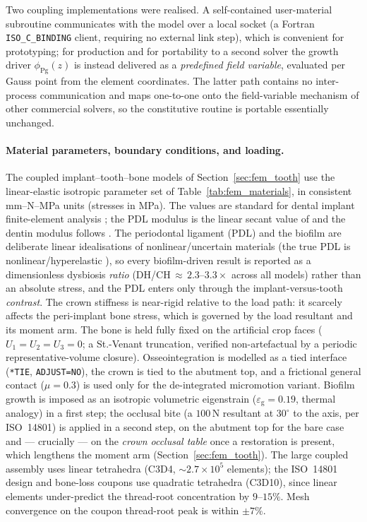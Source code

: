 Two coupling implementations were realised. A self-contained user-material
subroutine communicates with the model over a local socket (a Fortran
\texttt{ISO\_C\_BINDING} client, requiring no external link step), which is
convenient for prototyping; for production and for portability to a second solver the
growth driver $\phi_\mathrm{Pg}(z)$ is instead delivered as a \emph{predefined field
variable}, evaluated per Gauss point from the element coordinates. The latter path
contains no inter-process communication and maps one-to-one onto the field-variable
mechanism of other commercial solvers, so the constitutive routine is portable
essentially unchanged.

\paragraph{Material parameters, boundary conditions, and loading.}
The coupled implant--tooth--bone models of Section~\ref{sec:fem_tooth} use the
linear-elastic isotropic parameter set of Table~\ref{tab:fem_materials}, in
consistent mm--N--MPa units (stresses in MPa). The values are standard for dental
implant finite-element analysis \cite{Geng2001,Sevimay2005}; the PDL modulus is the
linear secant value of \citet{ReesJacobsen1997} and the dentin modulus follows
\citet{Kinney2003}. The periodontal ligament (PDL) and the biofilm are
deliberate linear idealisations of nonlinear/uncertain materials (the true PDL is
nonlinear/hyperelastic \cite{Cattaneo2005}), so every
biofilm-driven result is reported as a dimensionless dysbiosis \emph{ratio}
(DH/CH$\,\approx\,2.3$--$3.3\times$ across all models) rather than an absolute stress,
and the PDL enters only through the implant-versus-tooth \emph{contrast}. The crown
stiffness is near-rigid relative to the load path: it scarcely affects the
peri-implant bone stress, which is governed by the load resultant and its moment arm.
The bone is held fully fixed on the artificial crop faces ($U_1{=}U_2{=}U_3{=}0$; a
St.-Venant truncation, verified non-artefactual by a periodic representative-volume
closure). Osseointegration is modelled as a tied interface (\texttt{*TIE},
\texttt{ADJUST=NO}), the crown is tied to the abutment top, and a frictional general
contact ($\mu=0.3$) is used only for the de-integrated micromotion variant. Biofilm
growth is imposed as an isotropic volumetric eigenstrain ($\varepsilon_\mathrm{g}=0.19$,
thermal analogy) in a first step; the occlusal bite (a $100\,$N resultant at
$30^\circ$ to the axis, per ISO~14801) is applied in a second step, on the abutment
top for the bare case and --- crucially --- on the \emph{crown occlusal table} once a
restoration is present, which lengthens the moment arm (Section~\ref{sec:fem_tooth}).
The large coupled assembly uses linear tetrahedra (C3D4, ${\sim}2.7\times10^{5}$
elements); the ISO~14801 design and bone-loss coupons use quadratic tetrahedra (C3D10),
since linear elements under-predict the thread-root concentration by $9$--$15\%$. Mesh
convergence on the coupon thread-root peak is within $\pm7\%$.

